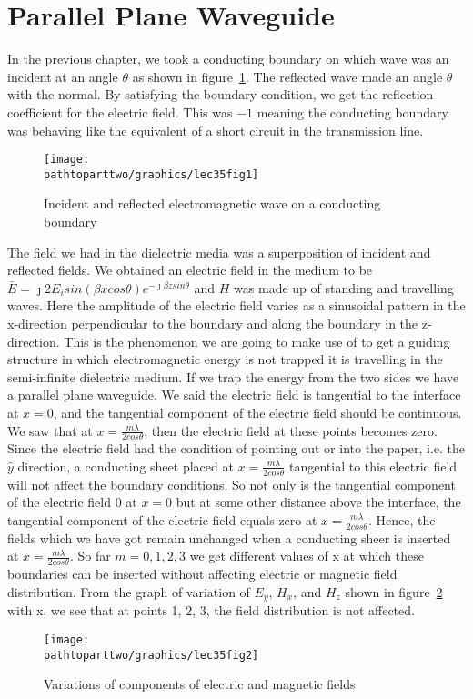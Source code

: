 \section{Parallel Plane Waveguide}
In the previous chapter, we took a conducting boundary on which wave was an incident at an angle $\theta$ as shown in figure~\ref{fig:lec35fig1}. The reflected wave made an angle $\theta$ with the normal. By satisfying the boundary condition, we get the reflection coefficient for the electric field. This was $-1$ meaning the conducting boundary was behaving like the equivalent of a short circuit in the transmission line.
\begin{figure}[h]
\centering
\texttt{[image: \\pathtoparttwo/graphics/lec35fig1]}
\caption{Incident and reflected electromagnetic wave on a conducting boundary}
\label{fig:lec35fig1}
\end{figure}
The field we had in the dielectric media was a superposition of incident and reflected fields. We obtained an electric field in the medium to be $\bar{E} = \jmath 2E_isin(\beta xcos\theta)e^{-\jmath\beta zsin\theta}$ and $H$ was made up of standing and travelling waves. Here the amplitude of the electric field varies as a sinusoidal pattern in the x-direction perpendicular to the boundary and along the boundary in the z-direction. This is the phenomenon we are going to make use of to get a guiding structure in which electromagnetic energy is not trapped it is travelling in the semi-infinite dielectric medium. If we trap the energy from the two sides we have a parallel plane waveguide. We said the electric field is tangential to the interface at $x=0$, and the tangential component of the electric field should be continuous. We saw that at $x=\frac{m\lambda}{2cos\theta}$, then the electric field at these points becomes zero. Since the electric field had the condition of pointing out or into the paper, i.e. the $\hat{y}$ direction, a conducting sheet placed at $x=\frac{m\lambda}{2cos\theta}$ tangential to this electric field will not affect the boundary conditions. So not only is the tangential component of the electric field 0 at $x=0$ but at some other distance above the interface, the tangential component of the electric field equals zero at $x=\frac{m\lambda}{2cos\theta}$. Hence, the fields which we have got remain unchanged when a conducting sheer is inserted at $x=\frac{m\lambda}{2cos\theta}$. So far $m=0, 1, 2, 3$ we get different values of x at which these boundaries can be inserted without affecting electric or magnetic field distribution. From the graph of variation of $E_y$, $H_x$, and $H_z$ shown in figure~\ref{fig:lec35fig2} with x, we see that at points 1, 2, 3, the field distribution is not affected.
\begin{figure}[h]
\centering
\texttt{[image: \\pathtoparttwo/graphics/lec35fig2]}
\caption{Variations of components of electric and magnetic fields}
\label{fig:lec35fig2}
\end{figure}

